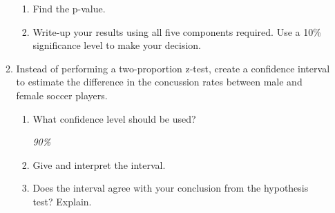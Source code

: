 \begin{enumerate}
\begin{enumerate}
\begin{enumerate}
           \item  Find the p-value.
\begin{students}
          \vspace{1cm}
\end{students}
\begin{key}
 {\it  }      
\end{key}

           \item  Write-up your results using all five components
             required.  Use a 10\% significance level to make your
             decision.  
\begin{students}
          \vspace{2cm}
\end{students}
\begin{key}
 {\it  }      
\end{key}
\end{enumerate}

         \item  Instead of performing a two-proportion z-test, create
           a confidence interval to estimate the difference
           in the concussion rates between male and female soccer
           players.
           \begin{enumerate}
           \item  What confidence level should be used? 
\begin{students}
          \vspace{1cm}
\end{students}
\begin{key}
 {\it 90\% }      
\end{key}
           \item  Give and interpret the interval.
\begin{students}
          \vspace{3cm}
\end{students}
\begin{key}
 {\it  }      
\end{key}

           \item  Does the interval agree with your conclusion from
             the hypothesis test?  Explain. 
\begin{students}
          \vspace{2cm}
\end{students}
\begin{key}
 {\it  }      
\end{key}


\end{enumerate}
\end{enumerate}
\end{enumerate}
